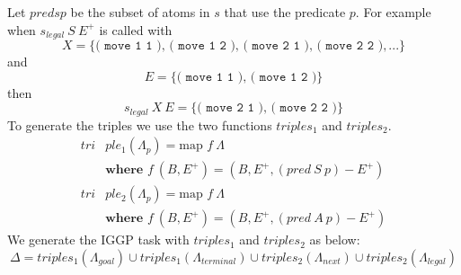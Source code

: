 Let $pred s p$ be the subset of atoms in $s$ that use the predicate $p$. For example when $s_{legal}\ S\ E^+$ is called with 
\[X = \{\texttt{( move 1 1 ), ( move 1 2 ), ( move 2 1 ), ( move 2 2 )}, ...\}\] 
and 
\[E = \{ \texttt{( move 1 1 ), ( move 1 2 )}\}\]
then 
\[s_{legal}\ X\ E = \{\texttt{( move 2 1 ), ( move 2 2 )}\}\]
To generate the triples we use the two functions $triples_1$ and $triples_2$.
\begin{align*}
tri&ple_1(\Lambda_p) = \text{map } f\ \Lambda \\
&\textbf{where } f\ (B,E^+) = (B,E^+,(pred\ S\ p) - E^+)\\
tri&ple_2(\Lambda_p) = \text{map } f\ \Lambda \\
&\textbf{where } f\ (B,E^+) = (B,E^+,(pred\ A\ p) - E^+)
\end{align*}
We generate the IGGP task with $triples_1$ and $triples_2$ as below:
\[\Delta = triples_1(\Lambda_{goal}) \cup triples_1(\Lambda_{terminal}) \cup triples_2(\Lambda_{next}) \cup triples_2(\Lambda_{legal})\]

